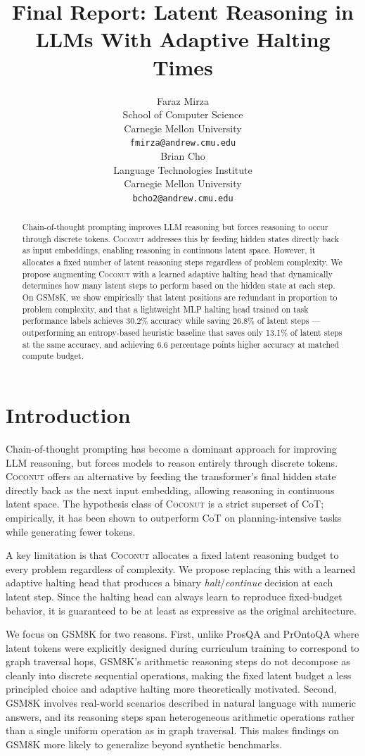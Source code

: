 \documentclass{article}
\title{Final Report: Latent Reasoning in LLMs With Adaptive Halting Times}
\author{
  Faraz Mirza \\
  School of Computer Science\\
  Carnegie Mellon University\\
  \texttt{fmirza@andrew.cmu.edu} \\
  \And
  Brian Cho \\
  Language Technologies Institute \\
  Carnegie Mellon University \\
  \texttt{bcho2@andrew.cmu.edu} \\
}
\begin{document}
\maketitle

\begin{abstract}
Chain-of-thought prompting improves LLM reasoning but forces reasoning to occur through discrete tokens. \textsc{Coconut} \citep{coconut2025} addresses this by feeding hidden states directly back as input embeddings, enabling reasoning in continuous latent space. However, it allocates a fixed number of latent reasoning steps regardless of problem complexity. We propose augmenting \textsc{Coconut} with a learned adaptive halting head that dynamically determines how many latent steps to perform based on the hidden state at each step. On GSM8K, we show empirically that latent positions are redundant in proportion to problem complexity, and that a lightweight MLP halting head trained on task performance labels achieves 30.2\% accuracy while saving 26.8\% of latent steps --- outperforming an entropy-based heuristic baseline that saves only 13.1\% of latent steps at the same accuracy, and achieving 6.6 percentage points higher accuracy at matched compute budget.
\end{abstract}

\section{Introduction}

Chain-of-thought prompting has become a dominant approach for improving LLM reasoning, but forces models to reason entirely through discrete tokens. \textsc{Coconut} \citep{coconut2025} offers an alternative by feeding the transformer's final hidden state directly back as the next input embedding, allowing reasoning in continuous latent space. The hypothesis class of \textsc{Coconut} is a strict superset of CoT; empirically, it has been shown to outperform CoT on planning-intensive tasks while generating fewer tokens.

A key limitation is that \textsc{Coconut} allocates a fixed latent reasoning budget to every problem regardless of complexity. We propose replacing this with a learned adaptive halting head that produces a binary \textit{halt}/\textit{continue} decision at each latent step. Since the halting head can always learn to reproduce fixed-budget behavior, it is guaranteed to be at least as expressive as the original architecture.

We focus on GSM8K for two reasons. First, unlike ProsQA and PrOntoQA where latent tokens were explicitly designed during curriculum training to correspond to graph traversal hops, GSM8K's arithmetic reasoning steps do not decompose as cleanly into discrete sequential operations, making the fixed latent budget a less principled choice and adaptive halting more theoretically motivated. Second, GSM8K involves real-world scenarios described in natural language with numeric answers, and its reasoning steps span heterogeneous arithmetic operations rather than a single uniform operation as in graph traversal. This makes findings on GSM8K more likely to generalize beyond synthetic benchmarks.
\end{document}
